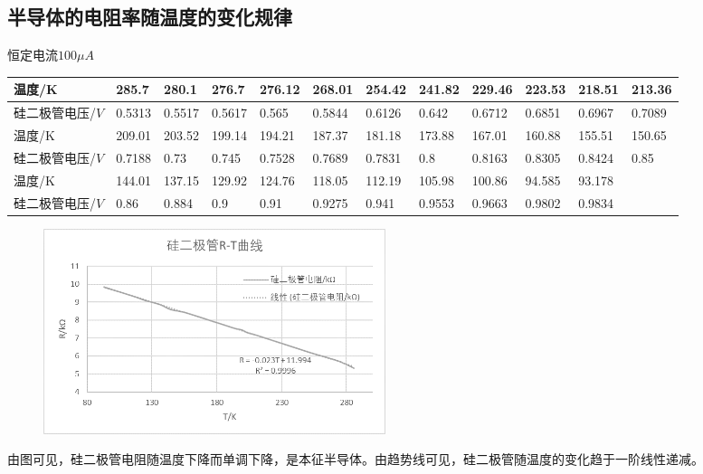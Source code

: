 \documentclass[UTF8]{ctexart}
\begin{document}
\subsection{半导体的电阻率随温度的变化规律}
恒定电流$100\mu A$
\begin{table}[H]
\tiny
\centering
\begin{tabular}{|l|l|l|l|l|l|l|l|l|l|l|l|}
\hline
温度/K            & 285.7  & 280.1  & 276.7  & 276.12 & 268.01 & 254.42 & 241.82 & 229.46 & 223.53 & 218.51 & 213.36 \\ \hline
硅二极管电压/$V$ & 0.5313 & 0.5517 & 0.5617 & 0.565  & 0.5844 & 0.6126 & 0.642  & 0.6712 & 0.6851 & 0.6967 & 0.7089 \\ \hline
温度/K            & 209.01 & 203.52 & 199.14 & 194.21 & 187.37 & 181.18 & 173.88 & 167.01 & 160.88 & 155.51 & 150.65 \\ \hline
硅二极管电压/$V$ & 0.7188 & 0.73   & 0.745  & 0.7528 & 0.7689 & 0.7831 & 0.8    & 0.8163 & 0.8305 & 0.8424 & 0.85   \\ \hline
温度/K            & 144.01 & 137.15 & 129.92 & 124.76 & 118.05 & 112.19 & 105.98 & 100.86 & 94.585 & 93.178 &        \\ \hline
硅二极管电压/$V$ & 0.86   & 0.884  & 0.9    & 0.91   & 0.9275 & 0.941  & 0.9553 & 0.9663 & 0.9802 & 0.9834 &        \\ \hline
\end{tabular}
\end{table}

\begin{figure}[H]
\centering
\includegraphics[width=10cm]{pic3.png}
\end{figure} 
由图可见，硅二极管电阻随温度下降而单调下降，是本征半导体。由趋势线可见，硅二极管随温度的变化趋于一阶线性递减。
\end{document}
